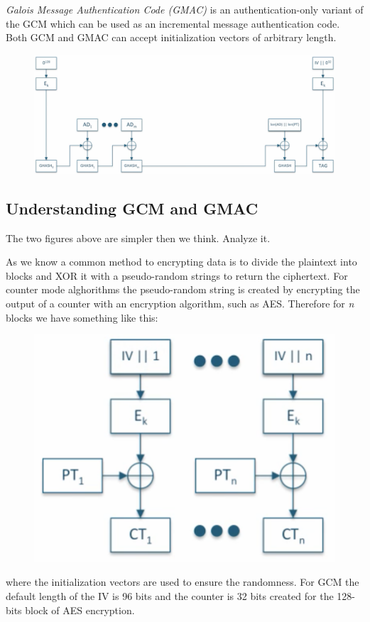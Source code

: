 \documentclass[11pt]{article}
\begin{document}
{\em Galois Message Authentication Code (GMAC)} is an authentication-only variant of the GCM which can be used as an incremental message authentication code. Both GCM and GMAC can accept initialization vectors of arbitrary length.

\begin{figure}[!ht]
  \includegraphics[width=1\textwidth]{pic2-hw3-1635747}
  \label{fig:GMAC}
\end{figure}

\newpage
\subsection{Understanding GCM and GMAC}
The two figures above are simpler then we think. Analyze it.

As we know a common method to encrypting data is to divide the plaintext into blocks and XOR it with a pseudo-random strings to return the ciphertext. For counter mode alghorithms the pseudo-random string is created by encrypting the output of a counter with an encryption algorithm, such as AES. Therefore for {\em n} blocks we have something like this:

\begin{figure}[hbt!]
  \centering
  \includegraphics[width=.40\textwidth, height=.2\textheight]{pic3-hw3-1635747}
  \label{fig:Counter Mode}
\end{figure}

where the initialization vectors are used to ensure the randomness. For GCM the default length of the IV is 96 bits and the counter is 32 bits created for the 128-bits block of AES encryption.
\end{document}
